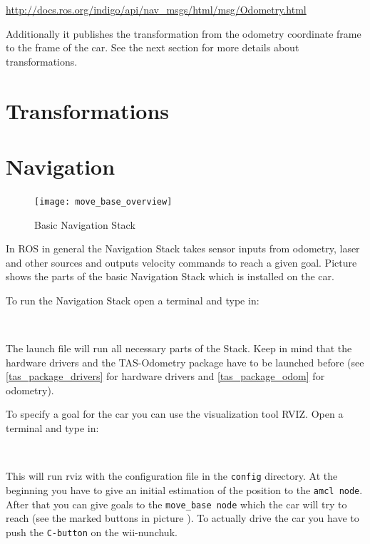 \hyperref[http://docs.ros.org/indigo/api/nav_msgs/html/msg/Odometry.html]{http://docs.ros.org/indigo/api/nav\_msgs/html/msg/Odometry.html}

Additionally it publishes the transformation from the odometry coordinate frame to the frame of the car. See the next section for more details about transformations.


\section{Transformations}
\label{sec:tas_package_transformations}

\newpage
\section{Navigation}
\label{sec:tas_package_navigation}

\begin{figure}[h]
	\centering
		\texttt{[image: move\_base\_overview]}
	\caption{Basic Navigation Stack}
	\label{fig:move_base_overview}
\end{figure}

In ROS in general the Navigation Stack takes sensor inputs from odometry, laser and other sources and outputs velocity commands to reach a given goal. Picture  shows the parts of the basic Navigation Stack which is installed on the car.

To run the Navigation Stack open a terminal and type in:

\\

The launch file will run all necessary parts of the Stack. Keep in mind that the hardware drivers and the TAS-Odometry package have to be launched before (see \ref{tas_package_drivers} for hardware drivers and \ref{tas_package_odom} for odometry).

To specify a goal for the car you can use the visualization tool RVIZ. Open a terminal and type in:

 \\

This will run rviz with the configuration file in the \texttt{config} directory. At the beginning you have to give an initial estimation of the position to the \texttt{amcl node}. After that you can give goals to the \texttt{move\_base node} which the car will try to reach (see the marked buttons in picture ). To actually drive the car you have to push the \texttt{C-button} on the wii-nunchuk. 

